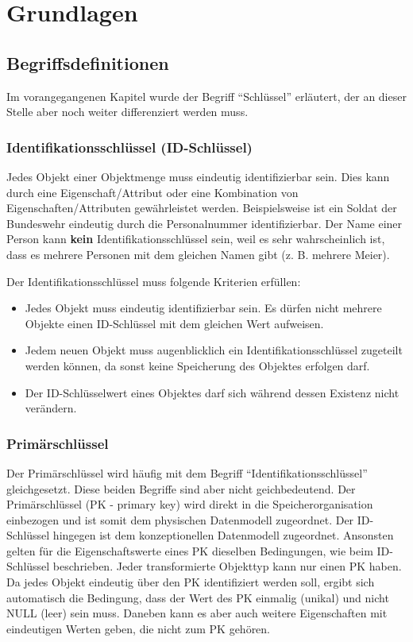     \section{Grundlagen}
      \subsection{Begriffsdefinitionen}
        \label{basics_definitions}
        Im vorangegangenen Kapitel wurde der Begriff \enquote{Schl\"ussel} erl\"autert, der an dieser Stelle aber noch weiter differenziert werden muss.
        \subsubsection{Identifikationsschl\"ussel (ID-Schl\"ussel)}
          Jedes Objekt einer Objektmenge muss eindeutig identifizierbar sein. Dies kann durch eine Eigenschaft/Attribut oder eine Kombination von Eigenschaften/Attributen gew\"ahrleistet werden. Beispielsweise ist ein Soldat der Bundeswehr eindeutig durch die Personalnummer identifizierbar. Der Name einer Person kann \textbf{kein} Identifikationsschl\"ussel sein, weil es sehr wahrscheinlich ist, dass es mehrere Personen mit dem gleichen Namen gibt (z. B. mehrere Meier).

          Der Identifikationsschl\"ussel muss folgende Kriterien erf\"ullen:
          \begin{itemize}
           \item Jedes Objekt muss eindeutig identifizierbar sein. Es d\"urfen nicht mehrere Objekte einen ID-Schl\"ussel mit dem gleichen Wert aufweisen.
           \item Jedem neuen Objekt muss augenblicklich ein Identifikationsschl\"ussel zugeteilt werden k\"onnen, da sonst keine Speicherung des Objektes erfolgen darf.
           \item Der ID-Schl\"usselwert eines Objektes darf sich w\"ahrend dessen Existenz nicht ver\"an\-dern.
          \end{itemize}
        \subsubsection{Prim\"arschl\"ussel}
          Der Prim\"arschl\"ussel wird h\"aufig mit dem Begriff \enquote{Identifikationsschl\"ussel} gleichgesetzt. Diese beiden Begriffe sind aber nicht geichbedeutend. Der Prim\"arschl\"ussel (PK - primary key) wird direkt in die Speicherorganisation einbezogen und ist somit dem physischen Datenmodell zugeordnet. Der ID-Schl\"ussel hingegen ist dem konzeptionellen Datenmodell zugeordnet. Ansonsten gelten f\"ur die Eigenschaftswerte eines PK dieselben Bedingungen, wie beim ID-Schl\"ussel beschrieben. Jeder transformierte Objekttyp kann nur einen PK haben. Da jedes Objekt eindeutig \"uber den PK identifiziert werden soll, ergibt sich automatisch die Bedingung, dass der Wert des PK einmalig (unikal) und nicht NULL (leer) sein muss. Daneben kann es aber auch weitere Eigenschaften mit eindeutigen Werten geben, die nicht zum PK geh\"oren.
\clearpage
